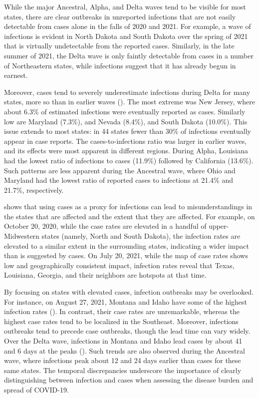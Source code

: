 While the major Ancestral, Alpha, and Delta waves tend to be visible for most
states, there are clear outbreaks in unreported infections that are not easily
detectable from cases alone in the falls of 2020 and 2021. For example, a wave
of infections is evident in North Dakota and South Dakota over the spring of
2021 that is virtually undetectable from the reported cases. Similarly, in the late summer
of 2021, the Delta wave is only faintly detectable from cases in a number of
Northeastern states, while infections suggest that it has already begun in earnest.  

Moreover, cases tend to 
severely underestimate infections during Delta for many states, more so
than in earlier waves (). 
The most extreme was New Jersey, where about 6.3\% of
estimated infections were eventually reported as cases. Similarly low are
Maryland (7.3\%), and Nevada (8.4\%), and South Dakota (10.0\%). This issue
extends to most states: in 44 states fewer than 30\% of infections eventually
appear in case reports. The cases-to-infections ratio was larger in earlier waves, and
its effects were most apparent in different regions. During Alpha, Louisiana had the
lowest ratio of infections to cases (11.9\%) followed by California (13.6\%).
Such patterns are less apparent during the Ancestral wave, where Ohio and
Maryland had the lowest ratio of reported cases to infections at 21.4\% and
21.7\%, respectively. 

 shows that using cases as a proxy for infections can lead 
to misunderstandings in the states that are affected and the extent that they
are affected. For example, on October 20, 2020, while the case rates are elevated in a
handful of upper-Midwestern states (namely, North and South Dakota), the infection
rates are elevated to a similar extent in the surrounding states,
indicating a wider impact than is suggested by cases. 
On July 20, 2021, while
the map of case rates shows low and geographically consistent impact, infection
rates reveal that Texas, Louisiana, Georgia, and their neighbors are hotspots at
 that time. 
 
By focusing on states with elevated cases, infection outbreaks may be
overlooked. For instance, on August 27, 2021, Montana and Idaho have some of the
highest infection rates ().
In contrast, their case rates are unremarkable, 
whereas the highest case rates tend to be localized in the Southeast. 
Moreover, infections outbreaks tend to precede case outbreaks, though 
the lead time can vary widely. Over the Delta wave,
infections in Montana and Idaho lead cases by about 41 and 6 days at the peaks 
(). Such trends are also observed during the Ancestral wave,
where infections peak about 12 and 24 days earlier than cases for these same states.
The temporal discrepancies underscore the importance of clearly distinguishing
between infection and cases when assessing the disease burden 
and spread of COVID-19.

